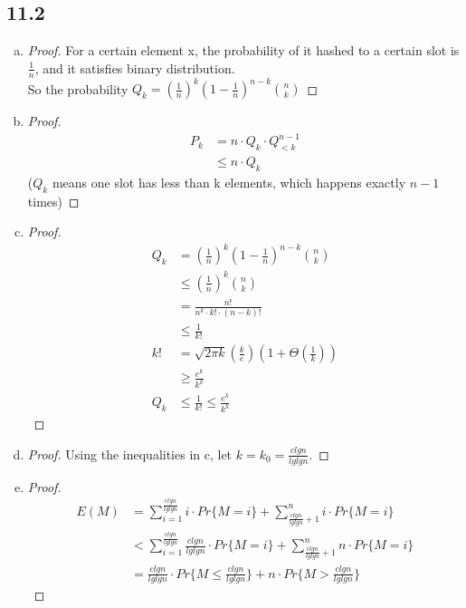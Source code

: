 \documentclass{article}
\begin{document}
\subsection*{11.2}
\begin{enumerate}[a.]
\item 
\begin{proof}
For a certain element x, the probability of it hashed to a certain slot is $\frac{1}{n}$, and it satisfies binary distribution.\\So the probability $Q_k=\left(\frac{1}{n}\right)^k\left(1-\frac{1}{n}\right)^{n-k}\binom{n}{k}$
\end{proof}
\item \begin{proof}
\begin{equation*}
\begin{aligned}
P_k&=n\cdot Q_k\cdot Q_{<k}^{n-1}\\
&\leq n\cdot Q_k
\end{aligned}
\end{equation*}
\setlength\parindent{4em}($Q_k$ means one slot has less than k elements, which happens exactly $n-1$ times)
\end{proof}
\item \begin{proof}
\begin{equation*}
\begin{aligned}
Q_k&=\left(\frac{1}{n}\right)^k\left(1-\frac{1}{n}\right)^{n-k}\binom{n}{k}\\
&\leq \left(\frac{1}{n}\right)^k\binom{n}{k}\\
&=\frac{n!}{n^k\cdot k!\cdot(n-k)!}\\
&\leq\frac{1}{k!}\\
k!&=\sqrt{2\pi k}\left(\frac{k}{e}\right)\left(1+\Theta(\frac{1}{k})\right)\\
&\geq \frac{e^k}{k^k}\\
Q_k&\leq\frac{1}{k!}\leq{\frac{e^k}{k^k}}
\end{aligned}
\end{equation*}
\end{proof}
\item \begin{proof}
Using the inequalities in c, let $k=k_0=\frac{clgn}{lglgn}$.
\end{proof}
\item \begin{proof}
\begin{equation*}
\begin{aligned}
E(M)&=\sum_{i=1}^{\frac{clgn}{lglgn}}i\cdot Pr\{M=i\}+\sum_{\frac{clgn}{lglgn}+1}^{n}i\cdot Pr\{M=i\}\\
&<\sum_{i=1}^{\frac{clgn}{lglgn}}\frac{clgn}{lglgn}\cdot Pr\{M=i\}+\sum_{\frac{clgn}{lglgn}+1}^{n}n\cdot Pr\{M=i\}\\
&=\frac{clgn}{lglgn}\cdot Pr\{M\leq \frac{clgn}{lglgn}\}+n\cdot Pr\{M>\frac{clgn}{lglgn}\}
\end{aligned}
\end{equation*}
\end{proof}
\end{enumerate}
\end{document}
